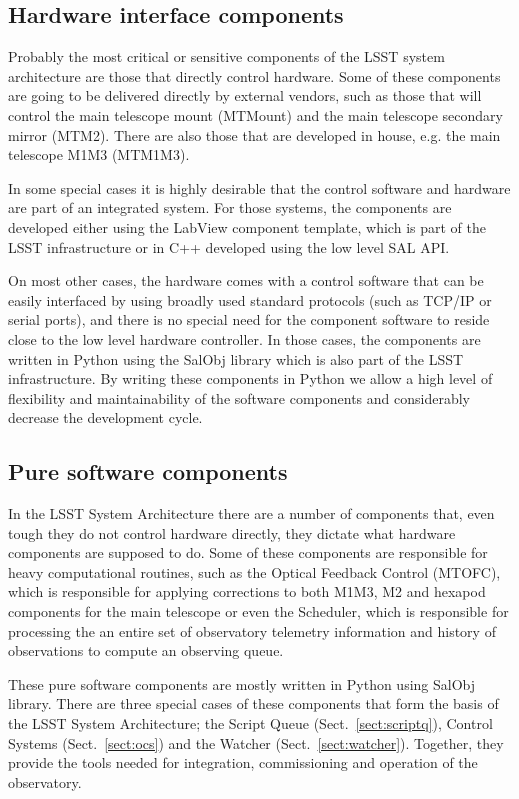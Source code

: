 \subsection{Hardware interface components}\label{sect:hardware_csc}
Probably the most critical or sensitive components of the LSST system architecture are those that directly control hardware. Some of these components are going to be delivered directly by external vendors, such as those that will control the main telescope mount (MTMount) and the main telescope secondary mirror (MTM2). There are also those that are developed in house, e.g. the main telescope M1M3 (MTM1M3). 

In some special cases it is highly desirable that the control software and hardware are part of an integrated system. For those systems, the components are developed either using the LabView component template, which is part of the LSST infrastructure or in C++ developed using the low level SAL API. 

On most other cases, the hardware comes with a control software that can be easily interfaced by using broadly used standard protocols (such as TCP/IP or serial ports), and there is no special need for the component software to reside close to the low level hardware controller. In those cases, the components are written in Python using the SalObj library which is also part of the LSST infrastructure. By writing these components in Python we allow a high level of flexibility and maintainability of the software components and considerably decrease the development cycle. 

\subsection{Pure software components}\label{sect:software_csc}
In the LSST System Architecture there are a number of components that, even tough they do not control hardware directly, they dictate what hardware components are supposed to do. Some of these components are responsible for heavy computational routines, such as the Optical Feedback Control (MTOFC), which is responsible for applying corrections to both M1M3, M2 and hexapod components for the main telescope or even the Scheduler, which is responsible for processing the an entire set of observatory telemetry information and history of observations to compute an observing queue. 

These pure software components are mostly written in Python using SalObj library. There are three special cases of these components that form the basis of the LSST System Architecture; the Script Queue (Sect.~\ref{sect:scriptq}), Control Systems (Sect.~\ref{sect:ocs}) and the Watcher (Sect.~\ref{sect:watcher}). Together, they provide the tools needed for integration, commissioning and operation of the observatory.  

